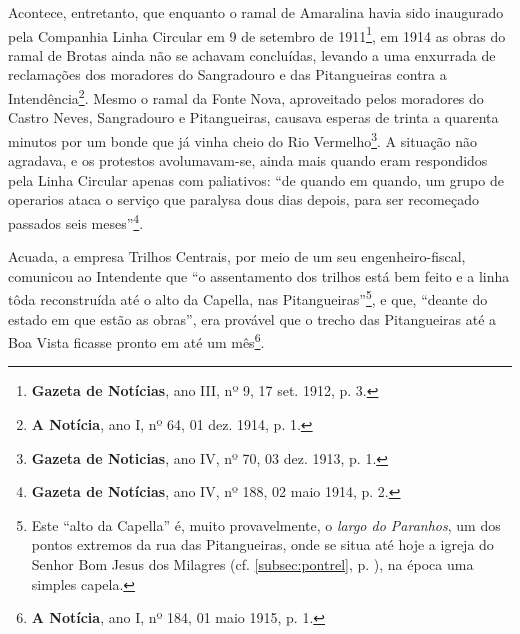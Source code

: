Acontece, entretanto, que enquanto o ramal de Amaralina havia sido inaugurado pela Companhia Linha Circular em 9 de setembro de 1911\footnote{\textbf{Gazeta de Notícias}, ano III, nº 9, 17 set. 1912, p. 3.}, em 1914 as obras do ramal de Brotas ainda não se achavam concluídas, levando a uma enxurrada de reclamações dos moradores do Sangradouro e das Pitangueiras contra a Intendência\footnote{\textbf{A Notícia}, ano I, nº 64, 01 dez. 1914, p. 1.}. Mesmo o ramal da Fonte Nova, aproveitado pelos moradores do Castro Neves, Sangradouro e Pitangueiras, causava esperas de trinta a quarenta minutos por um bonde que já vinha cheio do Rio Vermelho\footnote{\textbf{Gazeta de Noticias}, ano IV, nº 70, 03 dez. 1913, p. 1.}. A situação não agradava, e os protestos avolumavam-se, ainda mais quando eram respondidos pela Linha Circular apenas com paliativos: ``de quando em quando, um grupo de operarios ataca o serviço que paralysa dous dias depois, para ser recomeçado passados seis meses''\footnote{\textbf{Gazeta de Notícias}, ano IV, nº 188, 02 maio 1914, p. 2.}. 

Acuada, a empresa Trilhos Centrais, por meio de um seu engenheiro-fiscal, comunicou ao Intendente que ``o assentamento dos trilhos está bem feito e a linha tôda reconstruída até o alto da Capella, nas Pitangueiras''\footnote{Este ``alto da Capella'' é, muito provavelmente, o \textit{largo do Paranhos}, um dos pontos extremos da rua das Pitangueiras, onde se situa até hoje a igreja do Senhor Bom Jesus dos Milagres (cf. \autoref{subsec:pontrel}, p. \pageref{subsec:pontrel}), na época uma simples capela.}, e que, ``deante do estado em que estão as obras'', era provável que o trecho das Pitangueiras até a Boa Vista ficasse pronto em até um mês\footnote{\textbf{A Notícia}, ano I, nº 184, 01 maio 1915, p. 1.}. 

